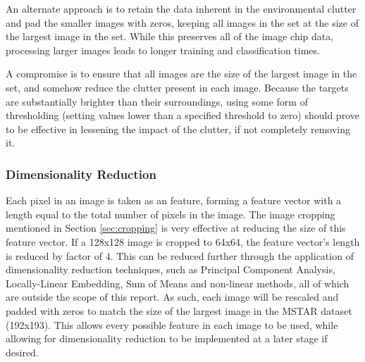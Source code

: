 An alternate approach is to retain the data inherent in the environmental clutter and pad the smaller images with zeros, keeping all images in the set at the size of the largest image in the set. While this preserves all of the image chip data, processing larger images leads to longer training and classification times.

A compromise is to ensure that all images are the size of the largest image in the set, and somehow reduce the clutter present in each image. Because the targets are substantially brighter than their surroundings, using some form of thresholding (setting values lower than a specified threshold to zero) should prove to be effective in lessening the impact of the clutter, if not completely removing it.

\subsubsection{Dimensionality Reduction}
Each pixel in an image is taken as an feature, forming a feature vector with a length equal to the total number of pixels in the image. The image cropping mentioned in Section \ref{sec:cropping} is very effective at reducing the size of this feature vector. If a 128x128 image is cropped to 64x64, the feature vector's length is reduced by factor of 4. This can be reduced further through the application of dimensionality reduction techniques, such as Principal Component Analysis, Locally-Linear Embedding, Sum of Means and non-linear methods, all of which are outside the scope of this report. As such, each image will be rescaled and padded with zeros to match the size of the largest image in the MSTAR dataset (192x193). This allows every possible feature in each image to be used, while allowing for dimensionality reduction to be implemented at a later stage if desired.


